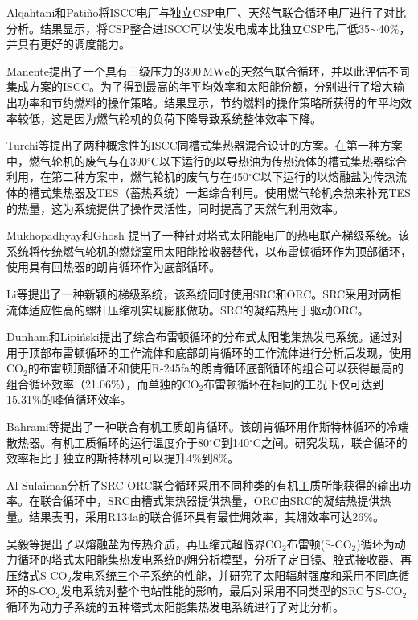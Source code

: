 Alqahtani和Pati\~{n}o\cite{Alqahtani2016}将ISCC电厂与独立CSP电厂、天然气联合循环电厂进行了对比分析。结果显示，将CSP整合进ISCC可以使发电成本比独立CSP电厂低35$\sim$40\%，并具有更好的调度能力。

Manente\cite{Manente2016}提出了一个具有三级压力的390$\,\mathrm{MWe}$的天然气联合循环，并以此评估不同集成方案的ISCC。为了得到最高的年平均效率和太阳能份额，分别进行了增大输出功率和节约燃料的操作策略。结果显示，节约燃料的操作策略所获得的年平均效率较低，这是因为燃气轮机的负荷下降导致系统整体效率下降。

Turchi等\cite{Turchi2014}提出了两种概念性的ISCC同槽式集热器混合设计的方案。在第一种方案中，燃气轮机的废气与在390$^\circ\mathrm{C}$以下运行的以导热油为传热流体的槽式集热器综合利用，在第二种方案中，燃气轮机的废气与在450$^\circ\mathrm{C}$以下运行的以熔融盐为传热流体的槽式集热器及TES（蓄热系统）一起综合利用。使用燃气轮机余热来补充TES的热量，这为系统提供了操作灵活性，同时提高了天然气利用效率。

Mukhopadhyay和Ghosh\cite{Mukhopadhyay2016}
提出了一种针对塔式太阳能电厂的热电联产梯级系统。该系统将传统燃气轮机的燃烧室用太阳能接收器替代，以布雷顿循环作为顶部循环，使用具有回热器的朗肯循环作为底部循环。

Li等\cite{Li2016a}提出了一种新颖的梯级系统，该系统同时使用SRC和ORC。SRC采用对两相流体适应性高的螺杆压缩机实现膨胀做功。SRC的凝结热用于驱动ORC。

Dunham和Lipi\'{n}ski\cite{Dunham2013}提出了综合布雷顿循环的分布式太阳能集热发电系统。通过对用于顶部布雷顿循环的工作流体和底部朗肯循环的工作流体进行分析后发现，使用CO$_2$的布雷顿顶部循环和使用R-245fa的朗肯循环底部循环的组合可以获得最高的组合循环效率（21.06\%），而单独的CO$_2$布雷顿循环在相同的工况下仅可达到15.31\%的峰值循环效率。

Bahrami等\cite{Bahrami2013}提出了一种联合有机工质朗肯循环。该朗肯循环用作斯特林循环的冷端散热器。有机工质循环的运行温度介于80$\mathrm{^\circ C}$到140$\mathrm{^\circ C}$之间。研究发现，联合循环的效率相比于独立的斯特林机可以提升4\%到8\%。

Al-Sulaiman\cite{AlSulaiman2014}分析了SRC-ORC联合循环采用不同种类的有机工质所能获得的输出功率。在联合循环中，SRC由槽式集热器提供热量，ORC由SRC的凝结热提供热量。结果表明，采用R134a的联合循环具有最佳㶲效率，其㶲效率可达26\%。

吴毅等\cite{Wu2016}提出了以熔融盐为传热介质，再压缩式超临界CO$_2$布雷顿(S-CO$_2$)循环为动力循环的塔式太阳能集热发电系统的㶲分析模型，分析了定日镜、腔式接收器、再压缩式S-CO$_2$发电系统三个子系统的性能，并研究了太阳辐射强度和采用不同底循环的S-CO$_2$发电系统对整个电站性能的影响，最后对采用不同类型的SRC与S-CO$_2$循环为动力子系统的五种塔式太阳能集热发电系统进行了对比分析。

